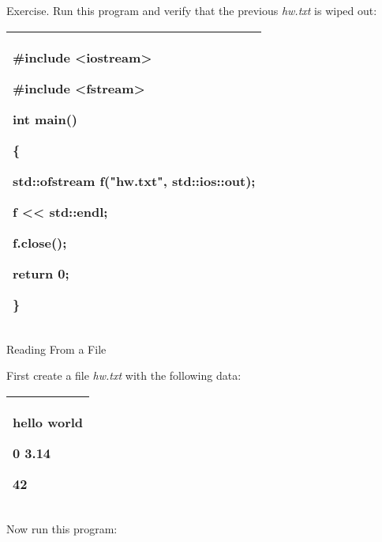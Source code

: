 \documentclass[
]{article}
\begin{document}
Exercise. Run this program and verify that the previous \emph{hw.txt} is
wiped out:

\begin{longtable}[]{@{}l@{}}
\toprule
\endhead
\begin{minipage}[t]{0.97\columnwidth}\raggedright
\#include \textless iostream\textgreater{}

\#include \textless fstream\textgreater{}

int main()

\{

std::ofstream f("hw.txt", std::ios::out);

f \textless\textless{} std::endl;

f.close();

return 0;

\}\strut
\end{minipage}\tabularnewline
\bottomrule
\end{longtable}

Reading From a File

First create a file \emph{hw.txt} with the following data:

\begin{longtable}[]{@{}l@{}}
\toprule
\endhead
\begin{minipage}[t]{0.97\columnwidth}\raggedright
hello world

0 3.14

42\strut
\end{minipage}\tabularnewline
\bottomrule
\end{longtable}

Now run this program:
\end{document}
